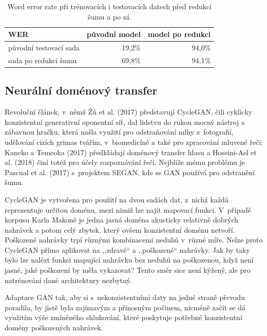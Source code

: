 \begin{table}[htpb]
\begin{center}
\begin{tabular}{|l||r|r|}
\hline
WER    & původní model & model po redukci \\
\hline
původní testovací sada & 19,2\% & 94,0\% \\
sada po redukci šumu   & 69,8\% & 94,1\% \\
\hline
\end{tabular}
\caption{Word error rate při trénovacích i testovacích datech před redukcí šumu
a po ní.}\label{tab:results-denoise}
\end{center}
\end{table}

\subsection{Neurální doménový transfer}

Revoluční článek\cite{cyclegan}, v~němž Žú et al. (2017) představují CycleGAN, čili
cyklicky konzistentní generativní oponentní síť, dal lidstvu do rukou mocný
nástroj a zábavnou hračku, která našla využití pro odstraňování mlhy
z~fotografií\cite{Engin_2018_CVPR_Workshops}, udělování cizích grimas
tvářím\cite{jin2017faceoff}, v~biomedicíně\cite{yang2018biogan} a také pro
zpracování mluvené řeči: Kaneko a Temeoka (2017)\cite{kaneko2017parallel} předkládají
doménový transfer hlasu a Hoseini-Asl et al. (2018)\cite{hosseini2018malevoicegan} činí
totéž pro účely rozpoznávání řeči. Nejblíže mému problému je Pascual et al. (2017)
s~projektem SEGAN\cite{pascual2017segan}, kde se GAN používá pro odstranění
šumu.

CycleGAN je vytvořena pro použití na dvou sadách dat, z~nichž každá reprezentuje
určitou doménu, mezi nimiž lze najít mapovací funkci. V~případě korpusu Karla
Makoně je jedna jasná doména akusticky relativně dobrých nahrávek a potom celý zbytek,
který ovšem konzistentní doménu netvoří. Poškozené nahrávky trpí různými
kombinacemi neduhů v~různé míře. Nelze proto CycleGAN přímo aplikovat na
,,zdravé`` a ,,poškozené`` nahrávky. Jak by taky bylo lze nalézt funkci mapující
nahrávku bez neduhů na poškozenou, když není jasné, jaké poškození by měla
vykazovat? Tento směr sice není kýžený, ale pro natrénování dané architektury
nezbytný.

Adaptace GAN tak, aby si s~nekonzistentními daty na jedné straně převodu
poradila, by jistě byla zajímavým a přínosným počinem, nicméně začít se dá
využitím výše zmíněného shlukování, které poskytuje potřebné konzistentní
domény poškozených nahrávek.

